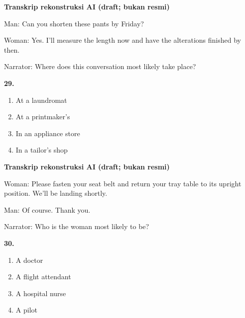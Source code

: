\documentclass[12pt]{article}
\begin{document}
\par
\vspace{0.25\baselineskip}
\begin{exampleblock}
\textbf{Transkrip rekonstruksi AI (draft; bukan resmi)}\par
Man: Can you shorten these pants by Friday?\par
Woman: Yes. I'll measure the length now and have the alterations finished by then.\par
Narrator: Where does this conversation most likely take place?\par
\end{exampleblock}
\noindent\textbf{29.}
\begin{enumerate}[label=(\Alph*),leftmargin=*,itemsep=0.2em]
\item At a laundromat
\item At a printmaker's
\item In an appliance store
\item In a tailor's shop
\end{enumerate}
\par
\vspace{0.25\baselineskip}
\begin{exampleblock}
\textbf{Transkrip rekonstruksi AI (draft; bukan resmi)}\par
Woman: Please fasten your seat belt and return your tray table to its upright position. We'll be landing shortly.\par
Man: Of course. Thank you.\par
Narrator: Who is the woman most likely to be?\par
\end{exampleblock}
\noindent\textbf{30.}
\begin{enumerate}[label=(\Alph*),leftmargin=*,itemsep=0.2em]
\item A doctor
\item A flight attendant
\item A hospital nurse
\item A pilot
\end{enumerate}
\par
\vspace{0.25\baselineskip}
\end{document}
